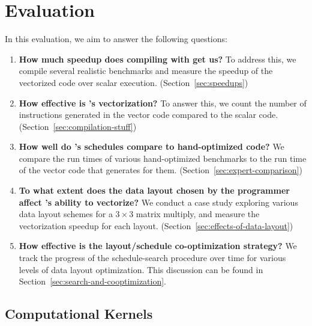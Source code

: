 \section{Evaluation}\label{sec:eval}


In this evaluation, we aim to answer the following questions:
\begin{enumerate}
    \item {\bf How much speedup does compiling with \system get us?} To address this, we compile several realistic benchmarks and measure the speedup of the vectorized code over scalar execution. (Section~\ref{sec:speedups})
    \item {\bf How effective is \system's vectorization?} To answer this, we count the number of instructions generated in the vector code compared to the scalar code. (Section~\ref{sec:compilation-stuff})
    \item {\bf How well do \system's schedules compare to hand-optimized code?} We compare the run times of various hand-optimized benchmarks to the run time of the vector code that \system generates for them. (Section~\ref{sec:expert-comparison})
    \item {\bf To what extent does the data layout chosen by the programmer affect \system's ability to vectorize?} We conduct a case study exploring various data layout schemes for a $3\times 3$ matrix multiply, and measure the vectorization speedup for each layout. (Section~\ref{sec:effects-of-data-layout})
   \item {\bf How effective is the layout/schedule co-optimization strategy?} We track the progress of the schedule-search procedure over time for various levels of data layout optimization. This discussion can be found in Section~\ref{sec:search-and-cooptimization}.
\end{enumerate}

\subsection{Computational Kernels}

